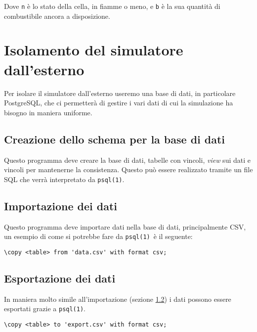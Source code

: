\documentclass[draft]{article}
\newcommand{\psql}{\texttt{psql(1)}}
\begin{document}
Dove \texttt{n} è lo stato della cella, in fiamme o meno, e \texttt{b} è la sua
quantità di combustibile ancora a disposizione.

\section{Isolamento del simulatore dall'esterno}

Per isolare il simulatore dall'esterno useremo una base di dati, in particolare
PostgreSQL, che ci permetterà di gestire i vari dati di cui la simulazione ha
bisogno in maniera uniforme.

\subsection{Creazione dello schema per la base di dati}

Questo programma deve creare la base di dati, tabelle con vincoli, \textit{view}
sui dati e vincoli per mantenerne la consistenza. Questo può essere realizzato
tramite un file SQL che verrà interpretato da \psql.

\subsection{Importazione dei dati}
\label{sec:import}

Questo programma deve importare dati nella base di dati, principalmente CSV, un
esempio di come si potrebbe fare da \psql\ è il seguente:

\begin{verbatim}
\copy <table> from 'data.csv' with format csv;
\end{verbatim}

\subsection{Esportazione dei dati}

In maniera molto simile all'importazione (sezione \ref{sec:import}) i dati
possono essere esportati grazie a \psql.

\begin{verbatim}
\copy <table> to 'export.csv' with format csv;
\end{verbatim}



\end{document}
